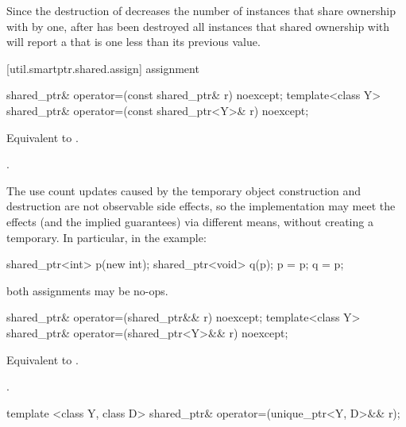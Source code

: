 \pnum
\begin{note} Since the destruction of 
decreases the number of instances that share ownership with 
by one,
after  has been destroyed
all  instances that shared ownership with
 will report a  that is one less
than its previous value. \end{note}

[util.smartptr.shared.assign]{ assignment}

%
\begin{itemdecl}
shared_ptr& operator=(const shared_ptr& r) noexcept;
template<class Y> shared_ptr& operator=(const shared_ptr<Y>& r) noexcept;
\end{itemdecl}

\begin{itemdescr}
\pnum\effects  Equivalent to .

\pnum\returns  {}.

\pnum \begin{note}
The use count updates caused by the temporary object
construction and destruction are not observable side
effects, so the implementation may meet the effects (and the
implied guarantees) via different means, without creating a
temporary. In particular, in the example:
\begin{codeblock}
shared_ptr<int> p(new int);
shared_ptr<void> q(p);
p = p;
q = p;
\end{codeblock}
both assignments may be no-ops. \end{note}
\end{itemdescr}

%
\begin{itemdecl}
shared_ptr& operator=(shared_ptr&& r) noexcept;
template<class Y> shared_ptr& operator=(shared_ptr<Y>&& r) noexcept;
\end{itemdecl}

\begin{itemdescr}
\pnum
\effects Equivalent to .

\pnum
\returns {}.
\end{itemdescr}

%
\begin{itemdecl}
template <class Y, class D> shared_ptr& operator=(unique_ptr<Y, D>&& r);
\end{itemdecl}

